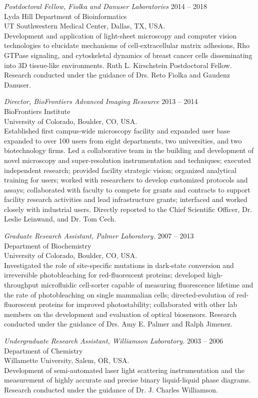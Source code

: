 {\sl Postdoctoral Fellow, Fiolka and Danuser Laboratories} \hfill 2014 -- 2018 \\ 
Lyda Hill Department of Bioinformatics \\
UT Southwestern Medical Center, Dallas, TX, USA. \hfill \\
\forceindent Development and application of light-sheet microscopy and computer vision technologies to elucidate mechanisms of cell-extracellular matrix adhesions, Rho GTPase signaling, and cytoskeletal dynamics of breast cancer cells disseminating into 3D tissue-like environments. Ruth L. Kirschstein Postdoctoral Fellow.  Research conducted under the guidance of Drs. Reto Fiolka and Gaudenz Danuser.

{\sl Director, BioFrontiers Advanced Imaging Resource} \hfill 2013 -- 2014 \\ 
BioFrontiers Institute \\
University of Colorado, Boulder, CO, USA. \hfill \\
\forceindent Established first campus-wide microscopy facility and expanded user base expanded to over 100 users from eight departments, two universities, and two biotechnology firms. Led a collaborative team in the building and development of novel microscopy and super-resolution instrumentation and techniques; executed independent research; provided facility strategic vision; organized analytical training for users; worked with researchers to develop customized protocols and assays; collaborated with faculty to compete for grants and contracts to support facility research activities and lead infrastructure grants;  interfaced and worked closely with industrial users.  Directly reported to the Chief Scientific Officer, Dr. Leslie Leinwand, and Dr. Tom Cech.

{\sl Graduate Research Assistant, Palmer Laboratory.} \hfill 2007 -- 2013 \\ 
Department of Biochemistry \\
University of Colorado, Boulder, CO, USA. \\
\forceindent Investigated the role of site-specific mutations in dark-state conversion and irreversible photobleaching for red-fluorescent proteins; developed high-throughput microfluidic cell-sorter capable of measuring fluorescence lifetime and the rate of photobleaching on single mammalian cells; directed-evolution of red-fluorescent proteins for improved photostability; collaborated with other lab members on the development and evaluation of optical biosensors.  Research conducted under the guidance of Drs. Amy E. Palmer and Ralph Jimenez. 

 {\sl Undergraduate Research Assistant, Williamson Laboratory.} \hfill 2003 -- 2006 \\ 
Department of Chemistry \\
Willamette University, Salem, OR, USA. \hfill \\
\forceindent Development of semi-automated laser light scattering instrumentation and the measurement of highly accurate and precise binary liquid-liquid phase diagrams.  Research conducted under the guidance of Dr. J. Charles Williamson.